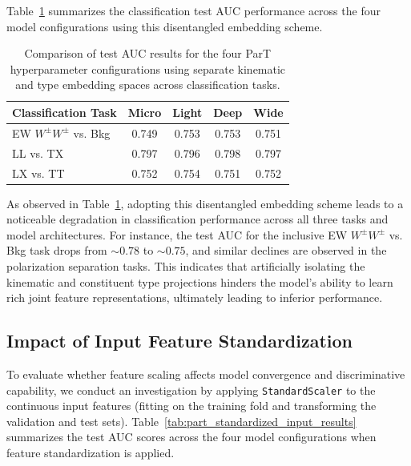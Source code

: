\documentclass[12pt]{article}
\begin{document}
		Table~\ref{tab:part_decoupled_embedding_results} summarizes the classification test AUC performance across the four model configurations using this disentangled embedding scheme.

		\begin{table}[htbp]
			\centering
			\caption{Comparison of test AUC results for the four ParT hyperparameter configurations using separate kinematic and type embedding spaces across classification tasks.}
			\label{tab:part_decoupled_embedding_results}
			\begin{tabular}{l|cccc}
				\hline
				\hline
                Classification Task      & Micro & Light & Deep  & Wide  \\ \hline
                EW $W^\pm W^\pm$ vs. Bkg & 0.749 & 0.753 & 0.753 & 0.751 \\
                LL vs. TX                & 0.797 & 0.796 & 0.798 & 0.797 \\
                LX vs. TT                & 0.752 & 0.754 & 0.751 & 0.752 \\
				\hline
				\hline
			\end{tabular}
		\end{table}

		As observed in Table~\ref{tab:part_decoupled_embedding_results}, adopting this disentangled embedding scheme leads to a noticeable degradation in classification performance across all three tasks and model architectures. For instance, the test AUC for the inclusive EW $W^\pm W^\pm$ vs. Bkg task drops from $\sim 0.78$ to $\sim 0.75$, and similar declines are observed in the polarization separation tasks. This indicates that artificially isolating the kinematic and constituent type projections hinders the model's ability to learn rich joint feature representations, ultimately leading to inferior performance.


	\subsection{Impact of Input Feature Standardization}%
	\label{sub:impact_of_input_feature_standardization}

		To evaluate whether feature scaling affects model convergence and discriminative capability, we conduct an investigation by applying \texttt{StandardScaler} to the continuous input features (fitting on the training fold and transforming the validation and test sets). Table~\ref{tab:part_standardized_input_results} summarizes the test AUC scores across the four model configurations when feature standardization is applied.
\end{document}
